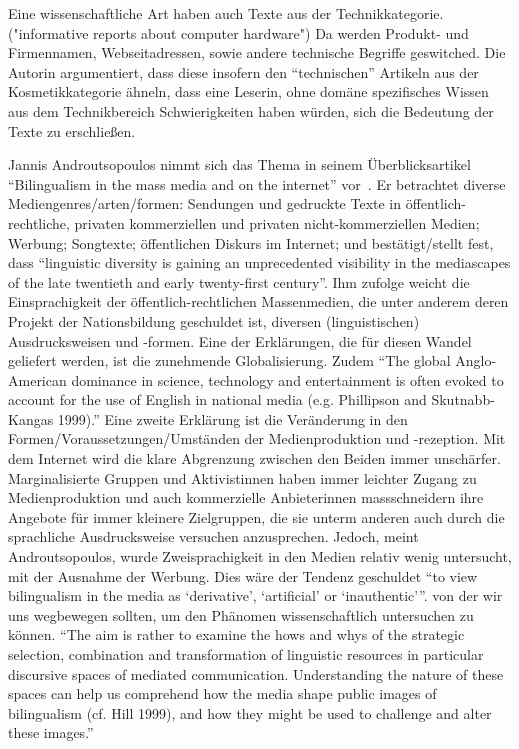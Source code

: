Eine wissenschaftliche Art haben auch Texte aus der Technikkategorie. ("informative reports about computer hardware")
Da werden Produkt- und Firmennamen, Webseitadressen, sowie andere technische Begriffe geswitched.
Die Autorin argumentiert, dass diese insofern den ``technischen'' Artikeln aus der Kosmetikkategorie ähneln, dass eine Leserin, ohne domäne spezifisches Wissen aus dem Technikbereich Schwierigkeiten haben würden, sich die Bedeutung der Texte zu erschließen.


Jannis Androutsopoulos nimmt sich das Thema in seinem Überblicksartikel ``Bilingualism in the mass media and on the internet'' vor~\cite[]{Andr07}.
Er betrachtet diverse Mediengenres/arten/formen: Sendungen und gedruckte Texte in öffentlich-rechtliche, privaten kommerziellen und privaten nicht-kommerziellen Medien; Werbung; Songtexte; öffentlichen Diskurs im Internet;
und bestätigt/stellt fest, dass ``linguistic diversity is gaining an unprecedented visibility in the mediascapes of the late twentieth and early twenty-first century''.
Ihm zufolge weicht die Einsprachigkeit der öffentlich-rechtlichen Massenmedien, die unter anderem deren Projekt der Nationsbildung geschuldet ist, diversen (linguistischen) Ausdrucksweisen und -formen.
Eine der Erklärungen, die für diesen Wandel geliefert werden, ist die zunehmende Globalisierung.
Zudem ``The global Anglo-American dominance in science, technology and entertainment is often evoked to account for the use of English in national media (e.g. Phillipson and Skutnabb-Kangas 1999).''
Eine zweite Erklärung ist die Veränderung in den Formen/Voraussetzungen/Umständen der Medienproduktion und -rezeption.
Mit dem Internet wird die klare Abgrenzung zwischen den Beiden immer unschärfer.
Marginalisierte Gruppen und Aktivistinnen haben immer leichter Zugang zu Medienproduktion und auch kommerzielle Anbieterinnen massschneidern ihre Angebote für immer kleinere Zielgruppen, die sie unterm anderen auch durch die sprachliche Ausdrucksweise versuchen anzusprechen.
Jedoch, meint Androutsopoulos, wurde Zweisprachigkeit in den Medien relativ wenig untersucht, mit der Ausnahme der Werbung.
Dies wäre der Tendenz geschuldet ``to view bilingualism in the media as ‘derivative’, ‘artificial’ or ‘inauthentic’''. %
von der wir uns wegbewegen sollten, um den Phänomen wissenschaftlich untersuchen zu können.
``The aim is rather to examine the
hows and whys of the strategic selection, combination and transformation of
linguistic resources in particular discursive spaces of mediated communication.
Understanding the nature of these spaces can help us comprehend how the
media shape public images of bilingualism (cf. Hill 1999), and how they
might be used to challenge and alter these images.'' %


